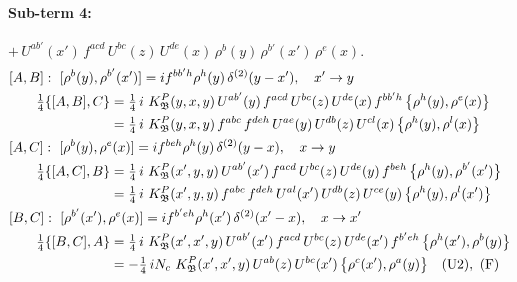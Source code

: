 \documentclass[10pt]{article}
\numberwithin{equation}{section}
\begin{document}
\paragraph{Sub-term 4:} $+\,U^{ab'}(x')\,f^{acd}\,U^{bc}(z)\,U^{de}(x)\,\rho^{b}(y)\,\rho^{b'}(x')\,\rho^{e}(x)$.
\begin{align}
&[A,B]:\ [\rho^{b}(y),\rho^{b'}(x')]=i f^{bb'h}\rho^{h}(y)\,\delta^{(2)}(y-x'),\quad x'\to y\notag\\
&\qquad \tfrac14\{[A,B],C\}=\tfrac14\,i\,\,K^{P}_{\mathfrak B}(y,x,y)\,U^{ab'}(y)\,f^{acd}\,U^{bc}(z)\,U^{de}(x)\,f^{bb'h}\,\big\{\rho^{h}(y),\rho^{e}(x)\big\}\notag\\
&\qquad\phantom{\tfrac14\{[A,B],C\}}=\tfrac14\,i\,\,K^{P}_{\mathfrak B}(y,x,y)\,f^{abc}\,f^{deh}\,U^{ae}(y)\,U^{db}(z)\,U^{cl}(x)\,\big\{\rho^{h}(y),\rho^{l}(x)\big\}
\label{B:eq:GIII.II.P-4-AB}\\
&[A,C]:\ [\rho^{b}(y),\rho^{e}(x)]=i f^{beh}\rho^{h}(y)\,\delta^{(2)}(y-x),\quad x\to y\notag\\
&\qquad \tfrac14\{[A,C],B\}=\tfrac14\,i\,\,K^{P}_{\mathfrak B}(x',y,y)\,U^{ab'}(x')\,f^{acd}\,U^{bc}(z)\,U^{de}(y)\,f^{beh}\,\big\{\rho^{h}(y),\rho^{b'}(x')\big\}\notag\\
&\qquad\phantom{\tfrac14\{[A,C],B\}}=\tfrac14\,i\,\,K^{P}_{\mathfrak B}(x',y,y)\,f^{abc}\,f^{deh}\,U^{al}(x')\,U^{db}(z)\,U^{ce}(y)\,\big\{\rho^{h}(y),\rho^{l}(x')\big\}
\label{B:eq:GIII.II.P-4-AC}\\
&[B,C]:\ [\rho^{b'}(x'),\rho^{e}(x)]=i f^{b'eh}\rho^{h}(x')\,\delta^{(2)}(x'-x),\quad x\to x'\notag\\
&\qquad \tfrac14\{[B,C],A\}=\tfrac14\,i\,\,K^{P}_{\mathfrak B}(x',x',y)\,U^{ab'}(x')\,f^{acd}\,U^{bc}(z)\,U^{de}(x')\,f^{b'eh}\,\big\{\rho^{h}(x'),\rho^{b}(y)\big\}\notag\\
&\qquad\phantom{\tfrac14\{[B,C],A\}}=-\tfrac14\,i N_{c}\,\,K^{P}_{\mathfrak B}(x',x',y)\,U^{ab}(z)\,U^{bc}(x')\,\big\{\rho^{c}(x'),\rho^{a}(y)\big\}\quad\text{(U2)},\ \text{(F)}
\label{B:eq:GIII.II.P-4-BC}
\end{align}
\end{document}
